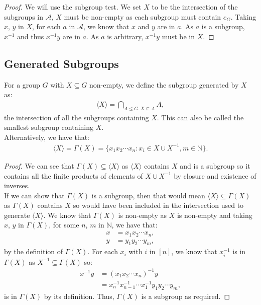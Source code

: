 \begin{proof}
    We will use the subgroup test. We set $X$ to be the intersection of
    the subgroups in $\mathcal{A}$, $X$ must be non-empty as each subgroup
    must contain $e_G$. Taking $x$, $y$ in $X$, for each $a$ in $\mathcal{A}$,
    we know that $x$ and $y$ are in $a$. As $a$ is a subgroup, $x^{-1}$ and
    thus $x^{-1}y$ are in $a$. As $a$ is arbitrary, $x^{-1}y$ must be in $X$.
\end{proof}

\subsection{Generated Subgroups}

For a group $G$ with $X \subseteq G$ non-empty, we define the subgroup generated by $X$ as:
\begin{align*}
    \langle X \rangle = \bigcap_{A \leq G : X \subseteq A} A,
\end{align*} the intersection of all the subgroups containing $X$.
This can also be called the smallest subgroup containing $X$.
\\[\baselineskip]
Alternatively, we have that: \begin{align*}
    \langle X \rangle = \Gamma(X) = \{x_1 x_2 \cdots x_n : x_i \in X \cup X^{-1}, m \in \mathbb{N} \}.
\end{align*}

\begin{proof}
    We can see that $\Gamma(X) \subseteq \langle X \rangle$ as $\langle X \rangle$
    contains $X$ and is a subgroup so it contains all the finite products
    of elements of $X \cup X^{-1}$ by closure and existence of inverses.
    \\[\baselineskip]
    If we can show that $\Gamma(X)$ is a subgroup, then that would mean
    $\langle X \rangle \subseteq \Gamma(X)$ as $\Gamma(X)$ contains $X$
    so would have been included in the intersection used to generate 
    $\langle X \rangle$. We know that $\Gamma(X)$ is non-empty as $X$ is
    non-empty and taking $x$, $y$ in $\Gamma(X)$, for some $n$, $m$ in $\mathbb{N}$,
    we have that: \begin{align*}
        x &= x_1 x_2 \cdots x_n, \\
        y &= y_1 y_2 \cdots y_m, 
    \end{align*} by the definition of $\Gamma(X)$. For each $x_i$ with
    $i$ in $[n]$, we know that $x_i^{-1}$ is in $\Gamma(X)$ as 
    $X^{-1} \subseteq \Gamma(X)$ so: \begin{align*}
        x^{-1}y &= (x_1 x_2 \cdots x_n)^{-1}y \\
        &= x_n^{-1}x_{n - 1}^{-1} \cdots x_1^{-1} y_1 y_2 \cdots y_m,
    \end{align*} is in $\Gamma(X)$ by its definition. Thus, $\Gamma(X)$
    is a subgroup as required.
\end{proof}


